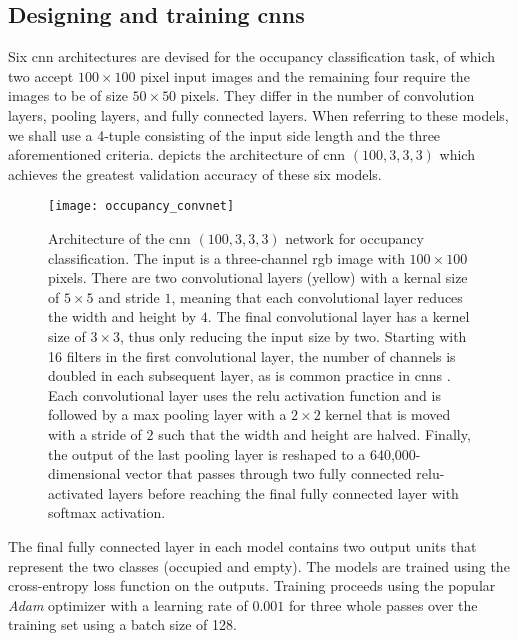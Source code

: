 \documentclass[../main.tex]{subfiles}
\begin{document}
\subsection{Designing and training \glspl{cnn}}
\label{sec:occupancy_cnns}
Six \gls{cnn} architectures are devised for the occupancy classification task, of which two accept $100\times 100$ pixel input images and the remaining four require the images to be of size $50\times 50$ pixels.
They differ in the number of convolution layers, pooling layers, and fully connected layers.
When referring to these models, we shall use a 4-tuple consisting of the input side length and the three aforementioned criteria.
 depicts the architecture of \acs{cnn} $(100, 3, 3, 3)$ which achieves the greatest validation accuracy of these six models.
\begin{figure}
    \centering
    \texttt{[image: occupancy\_convnet]}
    \caption[Architecture of the CNN $(100,3,3,3)$ network for occupancy classification.]{
        Architecture of the \gls{cnn} $(100,3,3,3)$ network for occupancy classification.
        The input is a three-channel \gls{rgb} image with $100\times 100$ pixels.
        There are two convolutional layers (yellow) with a kernal size of $5 \times 5$ and stride $1$, meaning that each convolutional layer reduces the width and height by $4$.
        The final convolutional layer has a kernel size of $3 \times 3$, thus only reducing the input size by two.
        Starting with 16 filters in the first convolutional layer, the number of channels is doubled in each subsequent layer, as is common practice in \glspl{cnn} \cite{simonyan2015}.
        Each convolutional layer uses the \gls{relu} activation function and is followed by a max pooling layer with a $2\times 2$ kernel that is moved with a stride of $2$ such that the width and height are halved.
        Finally, the output of the last pooling layer is reshaped to a 640,000-dimensional vector that passes through two fully connected \gls{relu}-activated layers before reaching the final fully connected layer with softmax activation.
    }
    \label{fig:occupancy_convnet}
\end{figure}
The final fully connected layer in each model contains two output units that represent the two classes (occupied and empty).
The models are trained using the cross-entropy loss function on the outputs.
Training proceeds using the popular \emph{Adam} optimizer \cite{kingma2017} with a learning rate of $0.001$ for three whole passes over the training set using a batch size of 128.
\end{document}
